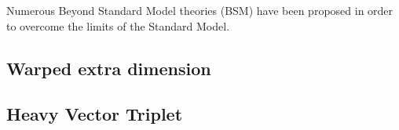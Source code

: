 Numerous Beyond Standard Model theories (BSM) have been proposed in order to overcome the limits of the Standard Model.
\subsection{Warped extra dimension}
\subsection{Heavy Vector Triplet}

\clearpage

